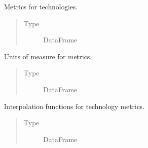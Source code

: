 \documentclass[letterpaper,10pt,english]{sphinxmanual}
\begin{document}
\begin{fulllineitems}

\begin{fulllineitems}
\label{\detokenize{tyche:tyche.Evaluator.Evaluator.metrics}}
Metrics for technologies.
\begin{quote}\begin{description}
\item[{Type}] \leavevmode
DataFrame

\end{description}\end{quote}

\end{fulllineitems}


\begin{fulllineitems}
\label{\detokenize{tyche:tyche.Evaluator.Evaluator.units}}
Units of measure for metrics.
\begin{quote}\begin{description}
\item[{Type}] \leavevmode
DataFrame

\end{description}\end{quote}

\end{fulllineitems}


\begin{fulllineitems}
\label{\detokenize{tyche:tyche.Evaluator.Evaluator.interpolators}}
Interpolation functions for technology metrics.
\begin{quote}\begin{description}
\item[{Type}] \leavevmode
DataFrame

\end{description}\end{quote}

\end{fulllineitems}


\end{fulllineitems}
\end{document}
